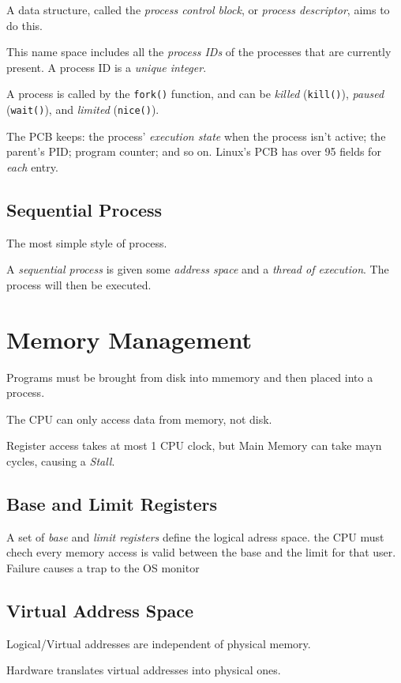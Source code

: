 \documentclass{article}
\begin{document}
A data structure, called the \textit{process control block}, or \textit{process descriptor}, aims to do this.

This name space includes all the \textit{process IDs} of the processes that are currently present. A process ID is a \textit{unique integer}.

A process is called by the \texttt{fork()} function, and can be \textit{killed} (\texttt{kill()}), \textit{paused} (\texttt{wait()}), and \textit{limited} (\texttt{nice()}).

The PCB keeps: the process' \textit{execution state} when the process isn't active; the parent's PID; program counter; and so on. Linux's PCB has over 95 fields for \textit{each} entry.

\subsection{Sequential Process}

The most simple style of process.

A \textit{sequential process} is given some \textit{address space} and a \textit{thread of execution}. The process will then be executed.

\section{Memory Management}
Programs must be brought from disk into mmemory and then placed into a process.

The CPU can only access data from memory, not disk.

Register access takes at most 1 CPU clock, but Main Memory can take mayn cycles, causing a \emph{Stall}.

\subsection{Base and Limit Registers}
A set of \emph{base} and \emph{limit registers} define the logical adress space. the CPU must chech every
memory access is valid between the base and the limit for that user. Failure causes a trap to the OS monitor

\subsection{Virtual Address Space}
Logical/Virtual addresses are independent of physical memory.

Hardware translates virtual addresses into physical ones.
\end{document}
